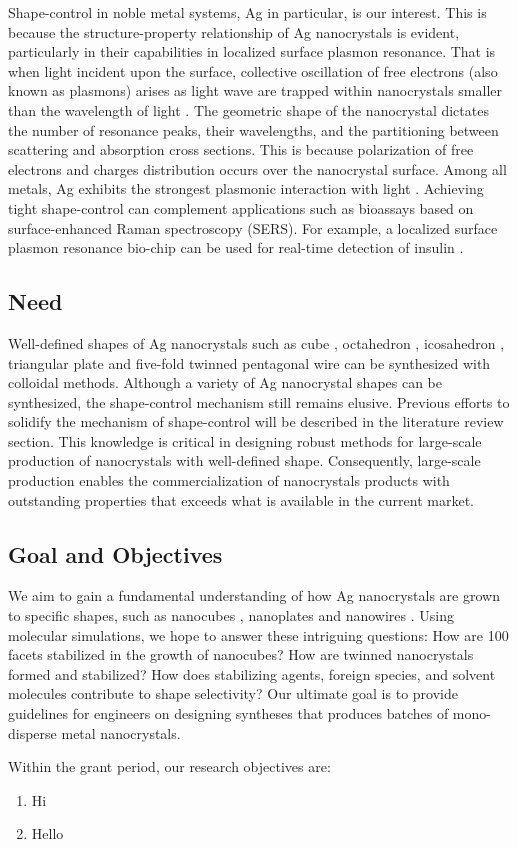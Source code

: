 Shape-control in noble metal systems, Ag in particular, is our interest.
This is because the structure-property relationship of Ag nanocrystals is evident, particularly in their capabilities in localized surface plasmon resonance.
That is when light incident upon the surface, collective oscillation of free electrons (also known as plasmons) arises as light wave are trapped within nanocrystals smaller than the wavelength of light \cite{Petryayeva_2011}.
The geometric shape of the nanocrystal dictates the number of resonance peaks, their wavelengths, and the partitioning between scattering and absorption cross sections.
This is because polarization of free electrons and charges distribution occurs over the nanocrystal surface.
Among all metals, Ag exhibits the strongest plasmonic interaction with light \cite{Lu_2009}.
Achieving tight shape-control can complement applications such as bioassays based on surface-enhanced Raman spectroscopy (SERS).
For example, a localized surface plasmon resonance bio-chip can be used for real-time detection of insulin \cite{Hiep_2008}.

\subsection{Need}

Well-defined shapes of Ag nanocrystals such as cube \cite{Im_2005}, octahedron \cite{Xia_2012}, icosahedron \cite{Xiong_2007}, triangular plate \cite{Lofton_2005} and five-fold twinned pentagonal wire \cite{Tsuji_2008} can be synthesized with colloidal methods.
Although a variety of Ag nanocrystal shapes can be synthesized, the shape-control mechanism still remains elusive.
Previous efforts to solidify the mechanism of shape-control will be described in the literature review section.
This knowledge is critical in designing robust methods for large-scale production of nanocrystals with well-defined shape.
Consequently, large-scale production enables the commercialization of nanocrystals products with outstanding properties that exceeds what is available in the current market.

\subsection{Goal and Objectives}

We aim to gain a fundamental understanding of how Ag nanocrystals are grown to specific shapes, such as nanocubes \cite{Im_2005}, nanoplates \cite{Lofton_2005} and nanowires \cite{Tsuji_2008}.
Using molecular simulations, we hope to answer these intriguing questions:
How are {100} facets stabilized in the growth of nanocubes?
How are twinned nanocrystals formed and stabilized?
How does stabilizing agents, foreign species, and solvent molecules contribute to shape selectivity?
Our ultimate goal is to provide guidelines for engineers on designing syntheses that produces batches of mono-disperse metal nanocrystals.

Within the grant period, our research objectives are:
\begin{enumerate}
\item Hi
\item Hello
\end{enumerate}
    